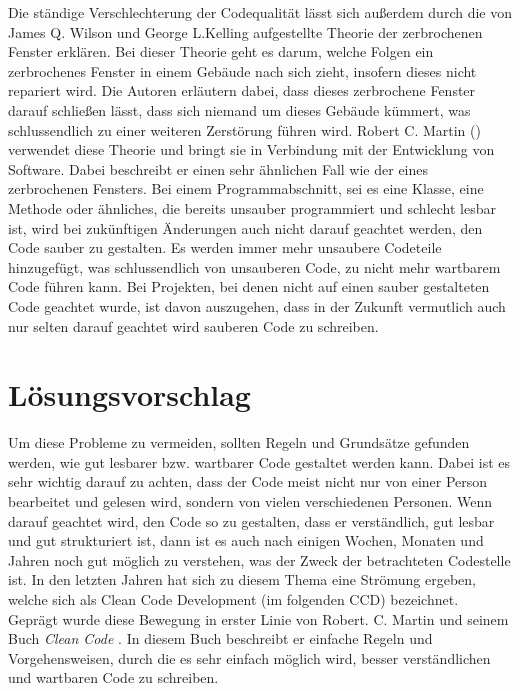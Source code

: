 \SuperPar Die ständige Verschlechterung der Codequalität lässt sich außerdem durch die von James Q. Wilson und George L.Kelling \cite{Wilson2016}  aufgestellte Theorie der zerbrochenen Fenster erklären. Bei dieser Theorie geht es darum, welche Folgen ein zerbrochenes Fenster in einem Gebäude nach sich zieht, insofern dieses nicht repariert wird. Die Autoren erläutern dabei, dass dieses zerbrochene Fenster darauf schließen lässt, dass sich niemand um dieses Gebäude kümmert, was schlussendlich zu einer weiteren Zerstörung führen wird. Robert C. Martin (\cite{Martin2008}) verwendet diese Theorie und bringt sie in Verbindung mit der Entwicklung von Software. Dabei beschreibt er einen sehr ähnlichen Fall wie der eines zerbrochenen Fensters. Bei einem Programmabschnitt, sei es eine Klasse, eine Methode oder ähnliches, die bereits unsauber programmiert und schlecht lesbar ist, wird bei zukünftigen Änderungen auch nicht darauf geachtet werden, den Code sauber zu gestalten. Es werden immer mehr unsaubere Codeteile hinzugefügt, was schlussendlich von unsauberen Code, zu nicht mehr wartbarem Code führen kann. Bei Projekten, bei denen nicht auf einen sauber gestalteten Code geachtet wurde, ist davon auszugehen, dass in der Zukunft vermutlich auch nur selten darauf geachtet wird sauberen Code zu schreiben. 

\section{Lösungsvorschlag}
Um diese Probleme zu vermeiden, sollten Regeln und Grundsätze gefunden werden, wie gut lesbarer bzw. wartbarer Code gestaltet werden kann. Dabei ist es sehr wichtig darauf zu achten, dass der Code meist nicht nur von einer Person bearbeitet und gelesen wird, sondern von vielen verschiedenen Personen. Wenn darauf geachtet wird, den Code so zu gestalten, dass er verständlich, gut lesbar und gut strukturiert ist, dann ist es auch nach einigen Wochen, Monaten und Jahren noch gut möglich zu verstehen, was der Zweck der betrachteten Codestelle ist. In den letzten Jahren hat sich zu diesem Thema eine Strömung ergeben, welche sich als Clean Code Development (im folgenden CCD) bezeichnet. Geprägt wurde diese Bewegung in erster Linie von Robert. C. Martin und seinem Buch \textit{Clean Code} \cite{Martin2008}. 
In diesem Buch beschreibt er einfache Regeln und Vorgehensweisen, durch die es sehr einfach möglich wird, besser verständlichen und wartbaren Code zu schreiben.

